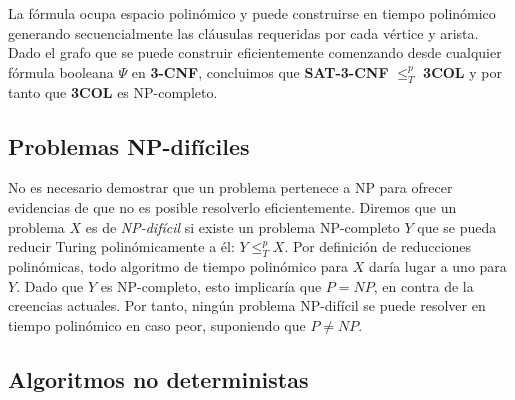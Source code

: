 La fórmula ocupa espacio polinómico y puede construirse en tiempo polinómico generando secuencialmente las cláusulas requeridas por cada vértice y arista. Dado el grafo que se puede construir eficientemente comenzando desde cualquier fórmula booleana $\Psi$ en \textbf{3-CNF}, concluimos que \textbf{SAT-3-CNF} $\leq _{T}^p$ \textbf{3COL} y por tanto que \textbf{3COL} es NP-completo.\\

\subsection{Problemas NP-difíciles}

No es necesario demostrar que un problema pertenece a NP para ofrecer evidencias de que no es posible resolverlo eficientemente. Diremos que un problema $X$ es de \emph{NP-difícil} si existe un problema NP-completo $Y$ que se pueda reducir Turing polinómicamente a él: $Y \leq _{T}^p X$. Por definición de reducciones polinómicas, todo algoritmo de tiempo polinómico para $X$ daría lugar a uno para $Y$. Dado que $Y$ es NP-completo, esto implicaría que $P = NP$, en contra de la creencias actuales. Por tanto, ningún problema NP-difícil se puede resolver en tiempo polinómico en caso peor, suponiendo que $P \neq NP$.\\

\subsection{Algoritmos no deterministas}

